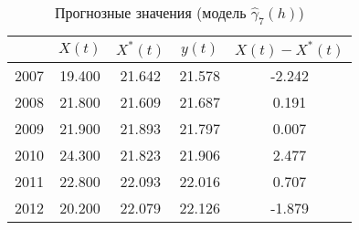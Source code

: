 \begin{table}[ht]
\centering
\begin{tabular}{r|cccc}
  \hline
 & $X(t)$ & $X^{*}(t)$ & $y(t)$ & $ X(t) - X^{*}(t) $ \\ 
  \hline
2007 & 19.400 & 21.642 & 21.578 & -2.242 \\ 
  2008 & 21.800 & 21.609 & 21.687 & 0.191 \\ 
  2009 & 21.900 & 21.893 & 21.797 & 0.007 \\ 
  2010 & 24.300 & 21.823 & 21.906 & 2.477 \\ 
  2011 & 22.800 & 22.093 & 22.016 & 0.707 \\ 
  2012 & 20.200 & 22.079 & 22.126 & -1.879 \\ 
   \hline
\end{tabular}
\caption{Прогнозные значения (модель $ \widehat{\gamma}_7(h) $)} 
\label{table:auto-class-20-prediction}
\end{table}
